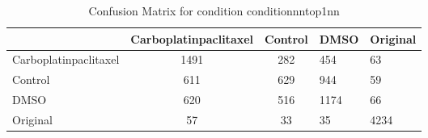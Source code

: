 \begin{table}[htbp]
\centering
\caption{Confusion Matrix for condition conditionnntop1nn}
\label{tab:confusionmatrix.condition.conditionnntop1nn}
\begin{tabular}{|l|cc|}
\toprule
 & Carboplatinpaclitaxel & Control & DMSO & Original \\
\midrule
Carboplatinpaclitaxel & 1491 & 282 & 454 & 63 \\
Control & 611 & 629 & 944 & 59 \\
DMSO & 620 & 516 & 1174 & 66 \\
Original & 57 & 33 & 35 & 4234 \\
\bottomrule
\end{tabular}
\end{table}
